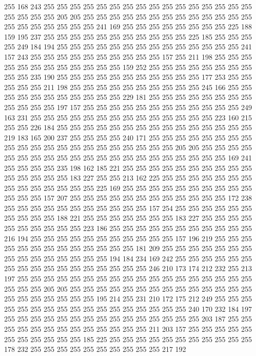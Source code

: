 255 168 243 255 255 255 255 255 255 255 255 255 255 255 255 255 255 255 255 255
255 255 255 205 205 255 255 255 255 255 255 255 255 255 255 255 255 255 255 255
255 255 255 255 255 241 169 255 255 255 255 255 255 255 255 225 188 159 195 237
255 255 255 255 255 255 255 255 255 255 255 225 185 255 255 255 255 249 184 194
255 255 255 255 255 255 255 255 255 255 255 255 255 255 241 157 243 255 255 255
255 255 255 255 255 255 255 157 255 211 198 255 255 255 255 255 255 255 255 255
255 255 255 159 252 255 255 255 255 255 255 255 255 255 255 235 190 255 255 255
255 255 255 255 255 255 255 255 177 253 255 255 255 255 255 211 198 255 255 255
255 255 255 255 255 255 255 245 166 255 255 255 255 255 255 255 255 255 255 255
229 181 255 255 255 255 255 255 255 255 255 255 255 255 197 157 255 255 255 255
255 255 255 255 255 255 255 255 249 163 231 255 255 255 255 255 255 255 255 255
255 255 255 255 255 223 160 215 255 255 226 184 255 255 255 255 255 255 255 255
255 255 255 255 255 255 255 219 183 165 200 237 255 255 255 255 240 171 255 255
255 255 255 255 255 255 255 255 255 255 255 255 255 255 255 255 255 255 255 205
205 255 255 255 255 255 255 255 255 255 255 255 255 255 255 255 255 255 255 255
255 255 169 241 255 255 255 255 235 198 162 185 221 255 255 255 255 255 255 255
255 255 255 255 255 255 255 255 183 227 255 255 213 162 225 255 255 255 255 255
255 255 255 255 255 255 255 255 255 225 169 255 255 255 255 255 255 255 255 255
255 255 255 255 157 207 255 255 255 255 255 255 255 255 255 255 255 255 172 238
255 255 255 255 255 255 255 255 255 255 255 157 254 255 255 255 255 255 255 255
255 255 255 188 221 255 255 255 255 255 255 255 183 227 255 255 255 255 255 255
255 255 255 255 223 186 255 255 255 255 255 255 255 255 255 255 255 216 194 255
255 255 255 255 255 255 255 255 255 255 157 196 219 255 255 255 255 255 255 255
255 255 255 255 255 255 181 209 255 255 255 255 255 255 255 255 255 255 255 255
255 255 255 194 184 234 169 242 255 255 255 255 255 255 255 255 255 255 255 255
255 255 255 255 255 246 210 173 174 212 232 255 213 197 255 255 255 255 255 255
255 255 255 255 255 255 255 255 255 255 255 255 255 255 255 205 205 255 255 255
255 255 255 255 255 255 255 255 255 255 255 255 255 255 255 255 255 255 195 214
255 231 210 172 175 212 249 255 255 255 255 255 255 255 255 255 255 255 255 255
255 255 255 255 240 170 232 184 197 255 255 255 255 255 255 255 255 255 255 255
255 255 255 255 203 187 255 255 255 255 255 255 255 255 255 255 255 255 255 211
203 157 255 255 255 255 255 255 255 255 255 255 255 185 225 255 255 255 255 255
255 255 255 255 255 255 178 232 255 255 255 255 255 255 255 255 255 255 217 192
